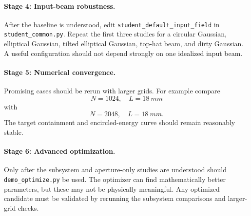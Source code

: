 \paragraph{Stage 4: Input-beam robustness.}
After the baseline is understood, edit \texttt{student\_default\_input\_field}
in \texttt{student\_common.py}. Repeat the first three studies for a circular
Gaussian, elliptical Gaussian, tilted elliptical Gaussian, top-hat beam, and dirty
Gaussian. A useful configuration should not depend strongly on one idealized input
beam.

\paragraph{Stage 5: Numerical convergence.}
Promising cases should be rerun with larger grids. For example compare
\[
    N=1024,\quad L=\SI{18}{mm}
\]
with
\[
    N=2048,\quad L=\SI{18}{mm}.
\]
The target containment and encircled-energy curve should remain reasonably stable.

\paragraph{Stage 6: Advanced optimization.}
Only after the subsystem and aperture-only studies are understood should
\texttt{demo\_optimize.py} be used. The optimizer can find mathematically better
parameters, but these may not be physically meaningful. Any optimized candidate
must be validated by rerunning the subsystem comparisons and larger-grid checks.
